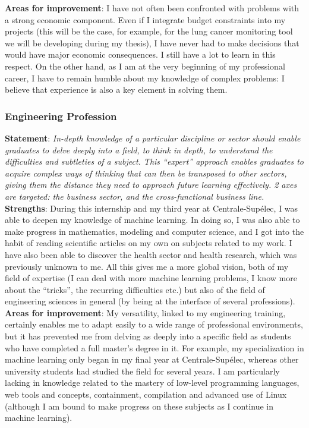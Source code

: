 \documentclass[preprint,12pt]{elsarticle}
\begin{document}
\noindent \textbf{Areas for improvement}: I have not often been confronted with problems with a strong economic component. Even if I integrate budget constraints into my projects (this will be the case, for example, for the lung cancer monitoring tool we will be developing during my thesis), I have never had to make decisions that would have major economic consequences. I still have a lot to learn in this respect. On the other hand, as I am at the very beginning of my professional career, I have to remain humble about my knowledge of complex problems: I believe that experience is also a key element in solving them.

\subsubsection{Engineering Profession}

\noindent \textbf{Statement}: \textit{In-depth knowledge of a particular discipline or sector should enable graduates to delve deeply into a field, to think in depth, to understand the difficulties and subtleties of a subject. This “expert” approach enables graduates to acquire complex ways of thinking that can then be transposed to other sectors, giving them the distance they need to approach future learning effectively. 2 axes are targeted: the business sector, and the cross-functional business line.}\\[3 pt]

\noindent \textbf{Strengths}: During this internship and my third year at Centrale-Supélec, I was able to deepen my knowledge of machine learning. In doing so, I was also able to make progress in mathematics, modeling and computer science, and I got into the habit of reading scientific articles on my own on subjects related to my work. I have also been able to discover the health sector and health research, which was previously unknown to me. All this gives me a more global vision, both of my field of expertise (I can deal with more machine learning problems, I know more about the “tricks”, the recurring difficulties etc.) but also of the field of engineering sciences in general (by being at the interface of several professions).\\[3 pt]

\noindent \textbf{Areas for improvement}: My versatility, linked to my engineering training, certainly enables me to adapt easily to a wide range of professional environments, but it has prevented me from delving as deeply into a specific field as students who have completed a full master's degree in it. For example, my specialization in machine learning only began in my final year at Centrale-Supélec, whereas other university students had studied the field for several years. I am particularly lacking in knowledge related to the mastery of low-level programming languages, web tools and concepts, containment, compilation and advanced use of Linux (although I am bound to make progress on these subjects as I continue in machine learning).
\end{document}
